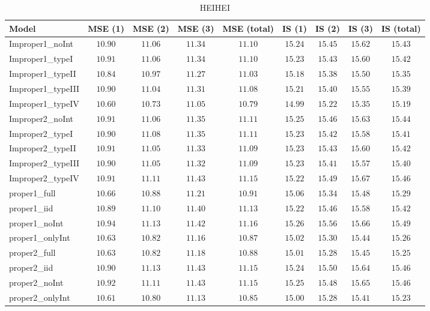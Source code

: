 \begin{table}

\caption{\label{tab:model-choice-sc8}HEIHEI}
\centering
\begin{tabular}{lcccccccc}
\hline
Model  & MSE (1) & MSE (2) & MSE (3) & MSE (total) & IS (1) & IS (2) & IS (3) & \multicolumn{1}{c}{IS (total)} \\ 
\hline
Improper1_noInt  & $10.90$ & $11.06$ & $11.34$ & $11.10$ & $15.24$ & $15.45$ & $15.62$ & $15.43$ \\
Improper1_typeI  & $10.91$ & $11.06$ & $11.34$ & $11.10$ & $15.23$ & $15.43$ & $15.60$ & $15.42$ \\
Improper1_typeII  & $10.84$ & $10.97$ & $11.27$ & $11.03$ & $15.18$ & $15.38$ & $15.50$ & $15.35$ \\
Improper1_typeIII  & $10.90$ & $11.04$ & $11.31$ & $11.08$ & $15.21$ & $15.40$ & $15.55$ & $15.39$ \\
Improper1_typeIV  & $10.60$ & $10.73$ & $11.05$ & $10.79$ & $14.99$ & $15.22$ & $15.35$ & $15.19$ \\
Improper2_noInt  & $10.91$ & $11.06$ & $11.35$ & $11.11$ & $15.25$ & $15.46$ & $15.63$ & $15.44$ \\
Improper2_typeI  & $10.90$ & $11.08$ & $11.35$ & $11.11$ & $15.23$ & $15.42$ & $15.58$ & $15.41$ \\
Improper2_typeII  & $10.91$ & $11.05$ & $11.33$ & $11.09$ & $15.23$ & $15.43$ & $15.60$ & $15.42$ \\
Improper2_typeIII  & $10.90$ & $11.05$ & $11.32$ & $11.09$ & $15.23$ & $15.41$ & $15.57$ & $15.40$ \\
Improper2_typeIV  & $10.91$ & $11.11$ & $11.43$ & $11.15$ & $15.22$ & $15.49$ & $15.67$ & $15.46$ \\
proper1_full  & $10.66$ & $10.88$ & $11.21$ & $10.91$ & $15.06$ & $15.34$ & $15.48$ & $15.29$ \\
proper1_iid  & $10.89$ & $11.10$ & $11.40$ & $11.13$ & $15.22$ & $15.46$ & $15.58$ & $15.42$ \\
proper1_noInt  & $10.94$ & $11.13$ & $11.42$ & $11.16$ & $15.26$ & $15.56$ & $15.66$ & $15.49$ \\
proper1_onlyInt  & $10.63$ & $10.82$ & $11.16$ & $10.87$ & $15.02$ & $15.30$ & $15.44$ & $15.26$ \\
proper2_full  & $10.63$ & $10.82$ & $11.18$ & $10.88$ & $15.01$ & $15.28$ & $15.45$ & $15.25$ \\
proper2_iid  & $10.90$ & $11.13$ & $11.43$ & $11.15$ & $15.24$ & $15.50$ & $15.64$ & $15.46$ \\
proper2_noInt  & $10.92$ & $11.11$ & $11.43$ & $11.15$ & $15.25$ & $15.48$ & $15.65$ & $15.46$ \\
proper2_onlyInt  & $10.61$ & $10.80$ & $11.13$ & $10.85$ & $15.00$ & $15.28$ & $15.41$ & $15.23$ \\
\hline 
\end{tabular}


\end{table}